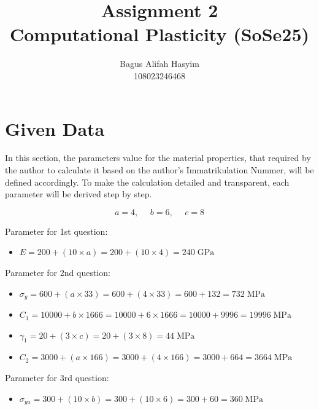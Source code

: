 \documentclass[12pt]{article}
\title{Assignment 2 \\ \large Computational Plasticity (SoSe25)}
\author{Bagus Alifah Hasyim \\ 108023246468}
\date{}
\begin{document}
\maketitle

\section*{Given Data}
\hspace*{2em}In this section, the parameters value for the material properties, 
that required by the author to calculate it based on the author's Immatrikulation Nummer, will be defined accordingly. To make
the calculation detailed and transparent, each parameter will be derived step by step. 

\begin{equation}
    a = 4, \text{   }\text{   } b = 6, \text{   }\text{   } c = 8
\end{equation}

\vspace{1em}
Parameter for 1st question:
\begin{itemize}
    \item $E = 200 + (10 \times a) = 200 + (10 \times 4 ) = 240 \;\text{GPa}$  
    
\end{itemize}

\vspace{1em}
Parameter for 2nd question:
\begin{itemize}
    \item $\sigma_y = 600 + (a \times 33) = 600 + (4 \times 33) = 600 + 132 = 732 \;\text{MPa}$
    \item $C_1 = 10000 + b \times 1666 = 10000 + 6 \times 1666 = 10000 + 9996 = 19996 \;\text{MPa}$
    \item $\gamma_1 = 20 + (3 \times c) = 20 + (3 \times 8) = 44 \;\text{MPa}$
    \item $C_2 = 3000 + (a \times 166) = 3000 + (4 \times 166) = 3000 + 664 = 3664 \;\text{MPa}$
\end{itemize}

\vspace{1em}
Parameter for 3rd question:
\begin{itemize}
    \item $\sigma_{ya} = 300 + (10 \times b ) = 300 + (10 \times 6) = 300 + 60 = 360 \;\text{MPa}$
\end{itemize}
\end{document}
